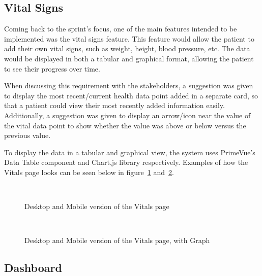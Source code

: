 \subsection{Vital Signs}

Coming back to the sprint's focus, one of the main features intended to be implemented was the vital signs feature. This feature would allow the patient to add their own vital signs, such as weight, height, blood pressure, etc. The data would be displayed in both a tabular and graphical format, allowing the patient to see their progress over time.

When discussing this requirement with the stakeholders, a suggestion was given to display the most recent/current health data point added in a separate card, so that a patient could view their most recently added information easily. Additionally, a suggestion was given to display an arrow/icon near the value of the vital data point to show whether the value was above or below versus the previous value.

To display the data in a tabular and graphical view, the system uses PrimeVue's Data Table component and Chart.js library respectively. Examples of how the Vitals page looks can be seen below in figure~\ref{fig:vitalspage} and~\ref{fig:vitalspagegraph}.

\begin{figure}[ht]
  \centering
  \\[\baselineskip]
  \caption{Desktop and Mobile version of the Vitals page}\label{fig:vitalspage}
\end{figure}

\FloatBarrier{}

\begin{figure}[ht]
  \centering
  \\[\baselineskip]
  \caption{Desktop and Mobile version of the Vitals page, with Graph}\label{fig:vitalspagegraph}
\end{figure}

\FloatBarrier{}

\subsection{Dashboard}

